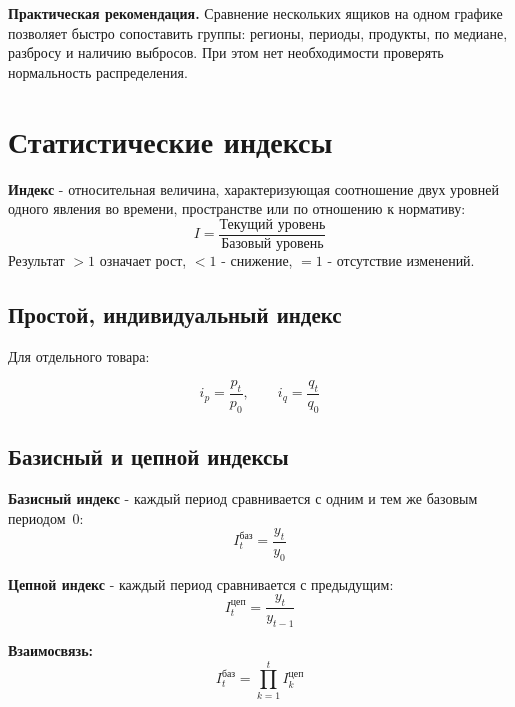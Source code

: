 \documentclass[a4paper]{article}
\begin{document}
	\textbf{Практическая рекомендация.} Сравнение нескольких ящиков на одном графике позволяет
	быстро сопоставить группы: регионы, периоды, продукты, по медиане, разбросу
	и наличию выбросов. При этом нет необходимости проверять нормальность
	распределения.
	
\section{Статистические индексы}


	\textbf{Индекс} - относительная величина, характеризующая соотношение двух
	уровней одного явления во времени, пространстве или по отношению к нормативу:
	\[
	I = \frac{\text{Текущий уровень}}{\text{Базовый уровень}}
	\]
	Результат $> 1$ означает рост, $< 1$ - снижение, $= 1$ - отсутствие изменений.


\subsection{Простой, индивидуальный индекс}

Для отдельного товара:

\begin{equation}
	i_p = \frac{p_t}{p_0}, \qquad i_q = \frac{q_t}{q_0}
\end{equation}

\subsection{Базисный и цепной индексы}

\noindent\textbf{Базисный индекс} - каждый период сравнивается с одним и тем же
базовым периодом~0:
\begin{equation}
	I^{\text{баз}}_t = \frac{y_t}{y_0}
\end{equation}

\noindent\textbf{Цепной индекс} - каждый период сравнивается с предыдущим:
\begin{equation}
	I^{\text{цеп}}_t = \frac{y_t}{y_{t-1}}
\end{equation}

\noindent\textbf{Взаимосвязь:}
\begin{equation}
	I^{\text{баз}}_t = \prod_{k=1}^{t} I^{\text{цеп}}_k
\end{equation}
\end{document}
